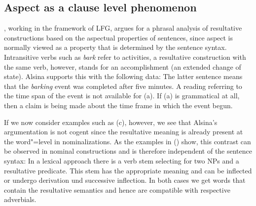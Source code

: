 \subsection{Aspect as a clause level phenomenon}
\label{sec-aspect-at-clause-level}

\citet{Alsina96a}, working in the framework of LFG\indexlfg, argues for a phrasal analysis of resultative constructions based on the aspectual properties
of sentences, since aspect is normally viewed as a property that is determined by the sentence syntax. Intransitive verbs such as \emph{bark}
refer to activities, a resultative construction with the same verb, however, stands for an accomplishment (an extended
change of state).
Alsina supports this with the following data:
\eal
\judgewidth{(*)}
\zl
The latter sentence means that the \emph{barking} event was completed after five minutes. A reading referring to the time span of the event
is not available for (a). If (a) is grammatical at all, then a claim is being made about the time frame in which the event begun.

If we now consider examples such as (c), however, we see that Alsina's argumentation is not cogent since the resultative
meaning is already  present at the word"=level in nominalizations. As the examples in () show, this contrast can be observed in nominal constructions
and is therefore independent of the sentence syntax:
\eal
\judgewidth{\#}
\zl
%
In a lexical approach there is a verb stem selecting for two NPs and a resultative predicate. This
stem has the appropriate meaning and can be inflected or undergo derivation und successive
inflection. In both cases we get words that contain the resultative semantics and hence are
compatible with respective adverbials. 





